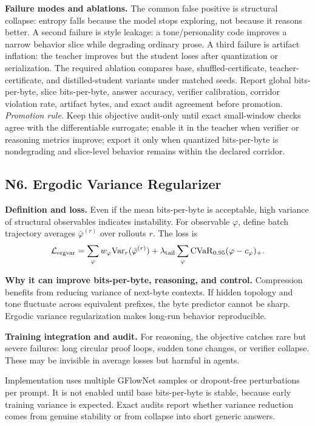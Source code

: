 \documentclass[10pt]{article}
\newcommand{\loss}{\mathcal{L}}
\numberwithin{equation}{section}
\begin{document}
\noindent\textbf{Failure modes and ablations.} The common false positive is structural collapse: entropy falls because the model stops exploring, not because it reasons better. A second failure is style leakage: a tone/personality code improves a narrow behavior slice while degrading ordinary prose. A third failure is artifact inflation: the teacher improves but the student loses after quantization or serialization. The required ablation compares base, shuffled-certificate, teacher-certificate, and distilled-student variants under matched seeds. Report global bits-per-byte, slice bits-per-byte, answer accuracy, verifier calibration, corridor violation rate, artifact bytes, and exact audit agreement before promotion.
\vfill
\noindent\emph{Promotion rule.} Keep this objective audit-only until exact small-window checks agree with the differentiable surrogate; enable it in the teacher when verifier or reasoning metrics improve; export it only when quantized bits-per-byte is nondegrading and slice-level behavior remains within the declared corridor.
\clearpage
\subsection{N6. Ergodic Variance Regularizer}
\noindent\textbf{Definition and loss.} Even if the mean bits-per-byte is acceptable, high variance of structural observables indicates instability. For observable $\varphi$, define batch trajectory averages $\bar\varphi^{(r)}$ over rollouts $r$. The loss is
\[
\loss_{\rm ergvar}=\sum_\varphi w_\varphi\mathrm{Var}_r(\bar\varphi^{(r)})+\lambda_{\rm tail}\sum_\varphi \mathrm{CVaR}_{0.95}(\varphi-c_\varphi)_+.
\]

\noindent\textbf{Why it can improve bits-per-byte, reasoning, and control.} Compression benefits from reducing variance of next-byte contexts. If hidden topology and tone fluctuate across equivalent prefixes, the byte predictor cannot be sharp. Ergodic variance regularization makes long-run behavior reproducible.

\noindent\textbf{Training integration and audit.} For reasoning, the objective catches rare but severe failures: long circular proof loops, sudden tone changes, or verifier collapse. These may be invisible in average losses but harmful in agents.

Implementation uses multiple GFlowNet samples or dropout-free perturbations per prompt. It is not enabled until base bits-per-byte is stable, because early training variance is expected. Exact audits report whether variance reduction comes from genuine stability or from collapse into short generic answers.
\end{document}
